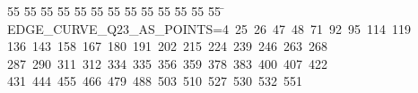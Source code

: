 %
%
\begin{tabbing}
55 \= 55 \= 55 \= 55 \= 55 \= 55 \= 55 \= 55 \= 55 \= 55 \= 55 \= 55 \= 55 \= \kill
EDGE\_CURVE\_Q23\_AS\_POINTS=4\ 25\ 26\ 47\ 48\ 71\ 92\ 95\ 114\ 119\ \\[0pt]
136\ 143\ 158\ 167\ 180\ 191\ 202\ 215\ 224\ 239\ 246\ 263\ 268\ \\[0pt]
287\ 290\ 311\ 312\ 334\ 335\ 356\ 359\ 378\ 383\ 400\ 407\ 422\ \\[0pt]
431\ 444\ 455\ 466\ 479\ 488\ 503\ 510\ 527\ 530\ 532\ 551\\[0pt]
\end{tabbing}
